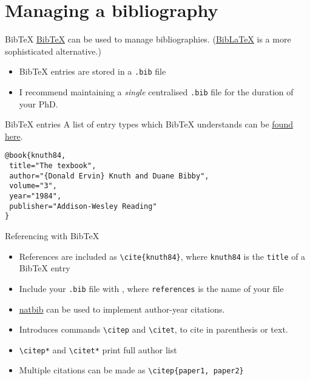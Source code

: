 \section{Managing a bibliography}

\begin{frame}[fragile]{BibTeX}
  \href{https://ctan.org/pkg/bibtex?lang=en}{BibTeX}
  can be used to manage bibliographies.
  (\href{https://ctan.org/pkg/biblatex?lang=en}{BibLaTeX}
  is a more sophisticated alternative.)

  \begin{itemize}
    \item BibTeX entries are stored in a \texttt{.bib} file
    \item I recommend maintaining a \emph{single} centralised \texttt{.bib}
      file for the duration of your PhD.
  \end{itemize}
\end{frame}

\begin{frame}[fragile]{BibTeX entries}
  A list of entry types which BibTeX understands can be
  \href{http://bib-it.sourceforge.net/help/fieldsAndEntryTypes.php#Entries}%
    {found here}.

  \begin{lstlisting}
@book{knuth84,
 title="The texbook",
 author="{Donald Ervin} Knuth and Duane Bibby",
 volume="3",
 year="1984",
 publisher="Addison-Wesley Reading"
}
  \end{lstlisting}
\end{frame}

\begin{frame}[fragile]{Referencing with BibTeX}
  \begin{itemize}
    \item References are included as \lstinline|\cite{knuth84}|, where
      \texttt{knuth84} is the \lstinline|title| of a BibTeX entry
    \item Include your \texttt{.bib} file with
      \lstinline||, where \texttt{references} is the
      name of your file
  \end{itemize}
\end{frame}

\begin{frame}[fragile]{}
  \begin{itemize}
    \item \href{https://ctan.org/pkg/natbib?lang=en}{natbib} can be used to
      implement author-year citations.
    \item Introduces commands \lstinline|\citep| and \lstinline|\citet|, to
      cite in parenthesis or text.
    \item \lstinline|\citep*| and \lstinline|\citet*| print full author list
    \item Multiple citations can be made as \lstinline|\citep{paper1, paper2}|
  \end{itemize}
\end{frame}


